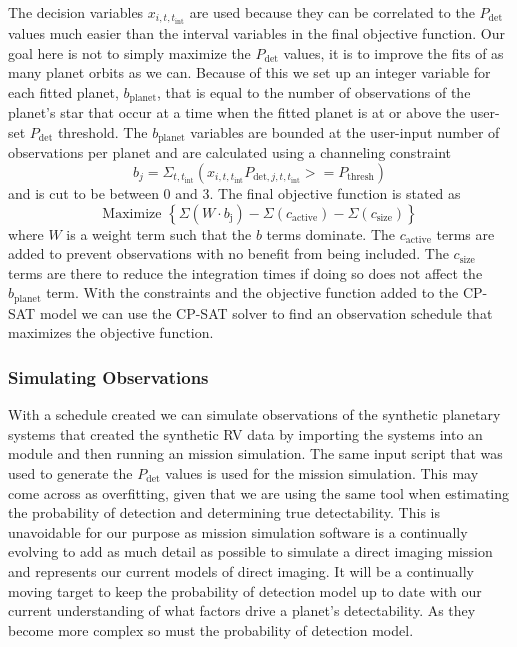 The decision variables $x_{i, t, t_{\textrm{int}}}$ are used because they can
be correlated to the $P_\textrm{det}$ values much easier than the interval
variables in the final objective function. Our goal here is not to simply
maximize the $P_\textrm{det}$ values, it is to improve the fits of as many
planet orbits as we can. Because of this we set up an integer variable for each
fitted planet, $b_\textrm{planet}$, that is equal to the number of observations
of the planet's star that occur at a time when the fitted planet is at or above
the user-set $P_\textrm{det}$ threshold. The $b_\textrm{planet}$ variables are
bounded at the user-input number of observations per planet and are calculated
using a channeling constraint
\begin{equation}
  b_j = \Sigma_{t, t_\textrm{int}}(x_{i, t, t_\textrm{int}}P_{\textrm{det}, j, t, t_\textrm{int}} >= P_\textrm{thresh})
  \label{eq:bplanet}
\end{equation}
and is cut to be between 0 and 3. The final objective function is stated as 
\begin{equation}
  \textrm{Maximize }{\left\{ \Sigma\left(W \cdot
  b_\textrm{j}\right) - \Sigma\left( c_\textrm{active}\right) - \Sigma\left(
  c_\textrm{size}\right) \right\}}
  \label{eq:final_obj_function}
\end{equation}
where $W$ is a weight term such that the $b$ terms dominate. The
$c_\textrm{active}$ terms are added to prevent observations with no benefit
from being included. The $c_\textrm{size}$ terms are there to reduce the
integration times if doing so does not affect the $b_\textrm{planet}$ term.
With the constraints and the objective function added to the CP-SAT model we
can use the CP-SAT solver to find an observation schedule that maximizes the
objective function.

\subsubsection{Simulating Observations}

With a schedule created we can simulate observations of the synthetic planetary
systems that created the synthetic RV data by importing the systems into an
  module and then running an
 mission simulation. The same  input script that
was used to generate the $P_\textrm{det}$ values is used for the mission
simulation. This may come across as overfitting, given that we are using the
same tool when estimating the probability of detection and determining true
detectability. This is unavoidable for our purpose as mission simulation
software is a continually evolving to add as much detail as possible to
simulate a direct imaging mission and represents our current models of direct
imaging. It will be a continually moving target to keep the probability of
detection model up to date with our current understanding of what factors drive
a planet's detectability. As they become more complex so must the probability
of detection model.

